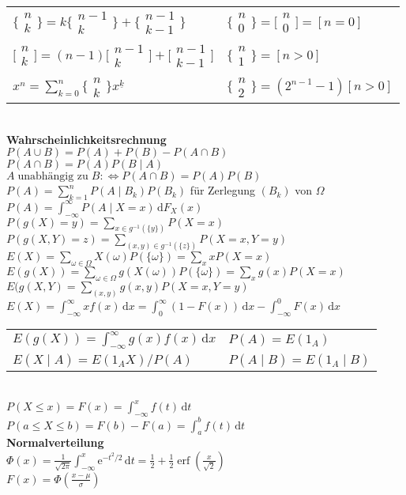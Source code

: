 \documentclass[a4paper,10pt,fleqn,twoside,twocolumn,dvipdfmx]{scrartcl}
\newcommand{\strong}[1]{\textsf{\textbf{#1}}}
\newcommand{\tsbrace}[2]{%
  \big\{\!\begin{smallmatrix}#1\\ #2\end{smallmatrix}\!\big\}}
\newcommand{\tsbracket}[2]{%
  \big[\!\begin{smallmatrix}#1\\ #2\end{smallmatrix}\!\big]}
\begin{document}
\begin{tabular}{@{}l|l}
$\tsbrace{n}{k} = k\tsbrace{n-1}{k}+\tsbrace{n-1}{k-1}$
& $\tsbrace{n}{0} = \tsbracket{n}{0} = [n{=}0]$\\[3pt]
$\tsbracket{n}{k} = (n-1)\tsbracket{n-1}{k}+\tsbracket{n-1}{k-1}$
& $\tsbrace{n}{1}=[n{>}0]$\\[3pt]
$x^n = \sum_{k=0}^n \tsbrace{n}{k} x^{\underline k}$
& $\tsbrace{n}{2} = (2^{n-1}-1)[n{>}0]$
\end{tabular}\\[4pt]
\strong{Wahrscheinlichkeitsrechnung}\\
$P(A\cup B) = P(A)+P(B)-P(A\cap B)$\\
$P(A\cap B) = P(A)P(B\mid A)$\\
$A\;\text{unabhängig zu}\;B :\Leftrightarrow P(A\cap B) = P(A)P(B)$\\
$P(A) = \sum_{k=1}^n P(A\mid B_k)P(B_k)$ für Zerlegung $(B_k)$ von $\Omega$\\
$P(A) = \int_{-\infty}^\infty P(A\mid X=x)\,\mathrm dF_X(x)$\\
$P(g(X)=y) = \sum_{x\in g^{-1}(\{y\})} P(X=x)$\\
$P(g(X,Y)=z) = \sum_{(x,y)\in g^{-1}(\{z\})} P(X=x,Y=y)$\\
$E(X) = \sum_{\omega\in\Omega} X(\omega)P(\{\omega\}) = \sum_x xP(X=x)$\\
$E(g(X)) = \sum_{\omega\in\Omega} g(X(\omega))P(\{\omega\}) = \sum_x g(x)P(X=x)$\\
$E(g(X,Y) = \sum_{(x,y)} g(x,y)P(X=x,Y=y)$\\
$E(X) = \int_{-\infty}^\infty xf(x)\,\mathrm dx
= \int_0^\infty (1-F(x))\,\mathrm dx - \int_{-\infty}^0 F(x)\,\mathrm dx$\\
\begin{tabular}{@{}l|l}
$E(g(X)) = \int_{-\infty}^\infty g(x)f(x)\,\mathrm dx$ & $P(A)=E(1_A)$\\
$E(X\mid A) = E(1_A X)/P(A)$ & $P(A\mid B) = E(1_A\mid B)$
\end{tabular}\\
$P(X\le x) = F(x) = \int_{-\infty}^x f(t)\,\mathrm dt$\\
$P(a\le X\le b) = F(b)-F(a) = \int_a^b f(t)\,\mathrm dt$\\[4pt]
\strong{Normalverteilung}\\
$\Phi(x) = \tfrac{1}{\sqrt{2\pi}}\int_{-\infty}^x \mathrm e^{-t^2/2}\,\mathrm dt
= \tfrac{1}{2}+\tfrac{1}{2}\operatorname{erf}(\tfrac{x}{\sqrt{2}})$\\
$F(x) = \Phi(\tfrac{x-\mu}{\sigma})$
\end{document}
